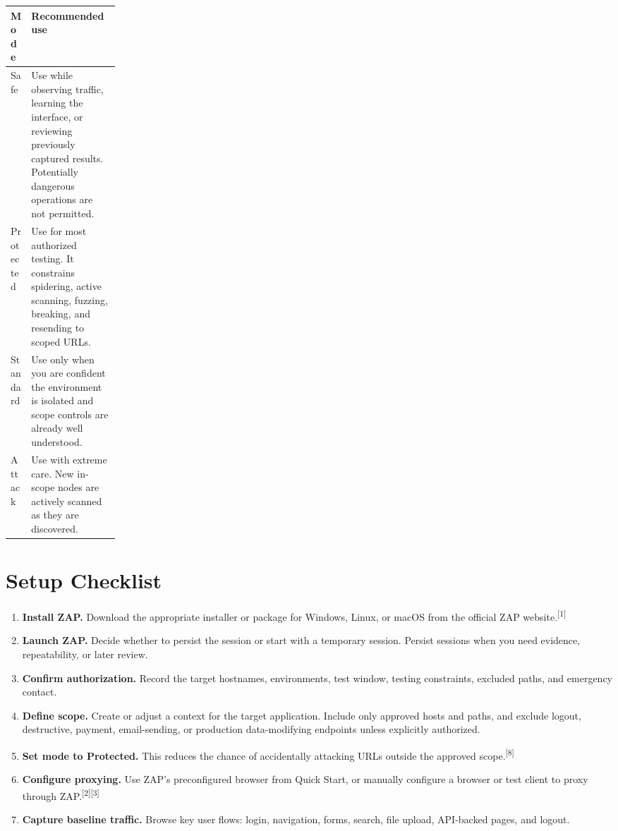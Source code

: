 \documentclass[11pt]{article}
\newcommand{\term}[1]{\textbf{#1}}
\newcommand{\source}[1]{\textsuperscript{[#1]}}
\begin{document}
\begin{tabularx}{\linewidth}{@{}p{0.18\linewidth}Y@{}}
\toprule
\textbf{Mode} & \textbf{Recommended use} \\
\midrule
Safe & Use while observing traffic, learning the interface, or reviewing previously captured results. Potentially dangerous operations are not permitted. \\
Protected & Use for most authorized testing. It constrains spidering, active scanning, fuzzing, breaking, and resending to scoped URLs. \\
Standard & Use only when you are confident the environment is isolated and scope controls are already well understood. \\
Attack & Use with extreme care. New in-scope nodes are actively scanned as they are discovered. \\
\bottomrule
\end{tabularx}

\section{Setup Checklist}

\begin{enumerate}
  \item \term{Install ZAP.} Download the appropriate installer or package for Windows, Linux, or macOS from the official ZAP website.\source{1}
  \item \term{Launch ZAP.} Decide whether to persist the session or start with a temporary session. Persist sessions when you need evidence, repeatability, or later review.
  \item \term{Confirm authorization.} Record the target hostnames, environments, test window, testing constraints, excluded paths, and emergency contact.
  \item \term{Define scope.} Create or adjust a context for the target application. Include only approved hosts and paths, and exclude logout, destructive, payment, email-sending, or production data-modifying endpoints unless explicitly authorized.
  \item \term{Set mode to Protected.} This reduces the chance of accidentally attacking URLs outside the approved scope.\source{8}
  \item \term{Configure proxying.} Use ZAP's preconfigured browser from Quick Start, or manually configure a browser or test client to proxy through ZAP.\source{2}\source{3}
  \item \term{Capture baseline traffic.} Browse key user flows: login, navigation, forms, search, file upload, API-backed pages, and logout.
\end{enumerate}
\end{document}
